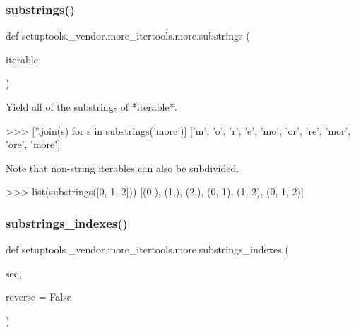 \subsubsection{\texorpdfstring{substrings()}{substrings()}}
{\footnotesize\ttfamily def setuptools.\+\_\+vendor.\+more\+\_\+itertools.\+more.\+substrings (\begin{DoxyParamCaption}\item[{}]{iterable }\end{DoxyParamCaption})}

\begin{DoxyVerb}Yield all of the substrings of *iterable*.

    >>> [''.join(s) for s in substrings('more')]
    ['m', 'o', 'r', 'e', 'mo', 'or', 're', 'mor', 'ore', 'more']

Note that non-string iterables can also be subdivided.

    >>> list(substrings([0, 1, 2]))
    [(0,), (1,), (2,), (0, 1), (1, 2), (0, 1, 2)]\end{DoxyVerb}
 \mbox{\label{namespacesetuptools_1_1__vendor_1_1more__itertools_1_1more_a782003c7b272487483afea0d79b61642}} 
\subsubsection{\texorpdfstring{substrings\+\_\+indexes()}{substrings\_indexes()}}
{\footnotesize\ttfamily def setuptools.\+\_\+vendor.\+more\+\_\+itertools.\+more.\+substrings\+\_\+indexes (\begin{DoxyParamCaption}\item[{}]{seq,  }\item[{}]{reverse = {\ttfamily False} }\end{DoxyParamCaption})}

